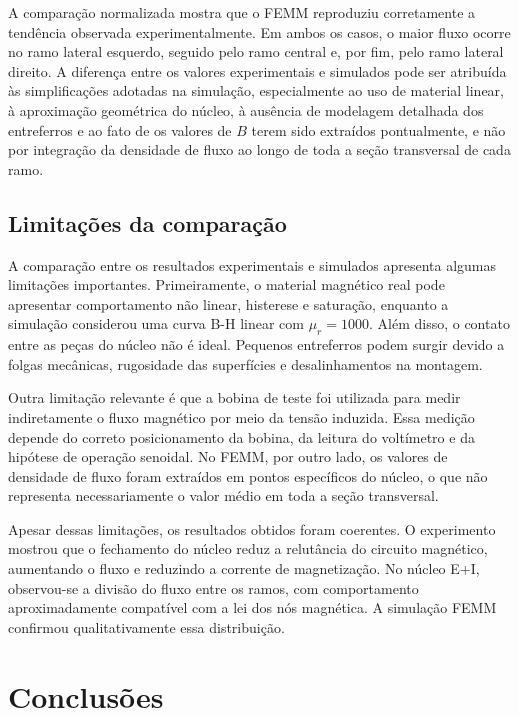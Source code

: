 \documentclass[11pt,a4paper]{article}
\begin{document}
A comparação normalizada mostra que o FEMM reproduziu corretamente a tendência observada experimentalmente. Em ambos os casos, o maior fluxo ocorre no ramo lateral esquerdo, seguido pelo ramo central e, por fim, pelo ramo lateral direito. A diferença entre os valores experimentais e simulados pode ser atribuída às simplificações adotadas na simulação, especialmente ao uso de material linear, à aproximação geométrica do núcleo, à ausência de modelagem detalhada dos entreferros e ao fato de os valores de \(B\) terem sido extraídos pontualmente, e não por integração da densidade de fluxo ao longo de toda a seção transversal de cada ramo.

\subsection{Limitações da comparação}

A comparação entre os resultados experimentais e simulados apresenta algumas limitações importantes. Primeiramente, o material magnético real pode apresentar comportamento não linear, histerese e saturação, enquanto a simulação considerou uma curva B-H linear com \(\mu_r = 1000\). Além disso, o contato entre as peças do núcleo não é ideal. Pequenos entreferros podem surgir devido a folgas mecânicas, rugosidade das superfícies e desalinhamentos na montagem.

Outra limitação relevante é que a bobina de teste foi utilizada para medir indiretamente o fluxo magnético por meio da tensão induzida. Essa medição depende do correto posicionamento da bobina, da leitura do voltímetro e da hipótese de operação senoidal. No FEMM, por outro lado, os valores de densidade de fluxo foram extraídos em pontos específicos do núcleo, o que não representa necessariamente o valor médio em toda a seção transversal.

Apesar dessas limitações, os resultados obtidos foram coerentes. O experimento mostrou que o fechamento do núcleo reduz a relutância do circuito magnético, aumentando o fluxo e reduzindo a corrente de magnetização. No núcleo E+I, observou-se a divisão do fluxo entre os ramos, com comportamento aproximadamente compatível com a lei dos nós magnética. A simulação FEMM confirmou qualitativamente essa distribuição.


\section{Conclusões}
\end{document}
